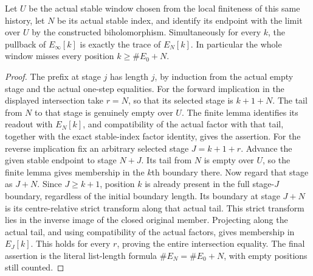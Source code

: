 \begin{theorem}
\label{hir:actual-lf-boundary-stable-window}
\leanok
Let $U$ be the actual stable window chosen from the local finiteness of this same
history, let $N$ be its actual stable index, and identify its endpoint with the
limit over $U$ by the constructed biholomorphism.  Simultaneously for every $k$,
the pullback of $E_\infty[k]$ is exactly the trace of $E_N[k]$.  In particular the
whole window misses every position $k\geq\#E_0+N$.
\end{theorem}
\begin{proof}
The prefix at stage $j$ has length $j$, by induction from the actual empty stage
and the actual one-step equalities.  For the forward implication in the displayed
intersection take $r=N$, so that its selected stage is $k+1+N$.  The tail from
$N$ to that stage is genuinely empty over $U$.  The finite lemma identifies its
readout with $E_N[k]$, and compatibility of the actual factor with that tail,
together with the exact stable-index factor identity, gives the assertion.
For the reverse implication fix an arbitrary selected stage $J=k+1+r$.  Advance
the given stable endpoint to stage $N+J$.  Its tail from $N$ is empty over $U$,
so the finite lemma gives membership in the $k$th boundary there.  Now regard
that stage as $J+N$.  Since $J\geq k+1$, position $k$ is already present in the
full stage-$J$ boundary, regardless of the initial boundary length.  Its boundary
at stage $J+N$ is its centre-relative strict transform along that actual tail.
This strict transform lies in the inverse image of the closed original member.
Projecting along the actual tail, and using compatibility of the actual factors,
gives membership in $E_J[k]$.  This holds for every $r$, proving the entire
intersection equality.  The final assertion is the literal list-length formula
$\#E_N=\#E_0+N$, with empty positions still counted.
\end{proof}

